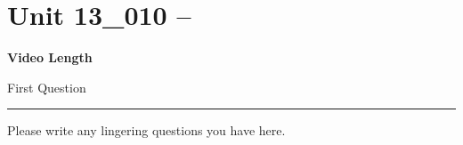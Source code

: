 \documentclass[letterpaper,12pt]{exam}
\newcommand{\unit}{Unit 13}
\begin{document}
\section*{\unit\_010 -- }
\par{\selectfont\textbf{Video Length }}
\begin{questions}
\begin{samepage}
    \question First Question
    \vspace{5mm}
\end{samepage}


\begin{center}
    \rule{0.5\textwidth}{.4pt}
\end{center}
Please write any lingering questions you have here.
\end{questions}
\end{document}
